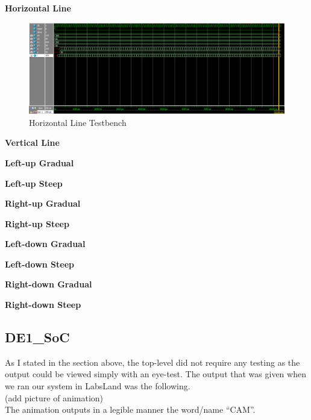 \documentclass[11pt, titlepage]{article}
\begin{document}
            \begin{description}
                \item \textbf{Horizontal Line} \\
                    \begin{figure}[H]
                        \centering
                        \includegraphics[scale = 0.5]{Images/horizontal line testbench.png}
                        \caption{Horizontal Line Testbench}
                    \end{figure}
                \item \textbf{Vertical Line} \\
                \item \textbf{Left-up Gradual} \\
                \item \textbf{Left-up Steep} \\
                \item \textbf{Right-up Gradual} \\
                \item \textbf{Right-up Steep} \\
                \item \textbf{Left-down Gradual} \\
                \item \textbf{Left-down Steep} \\
                \item \textbf{Right-down Gradual} \\
                \item \textbf{Right-down Steep} \\
            \end{description}

        \subsection{DE1\_SoC}
            As I stated in the section above, the top-level did not require any testing as the output could be viewed simply with an eye-test. The output that was given when we ran our system in LabsLand was the following. \\
            (add picture of animation) \\
            The animation outputs in a legible manner the word/name “CAM”.
        
\end{document}

